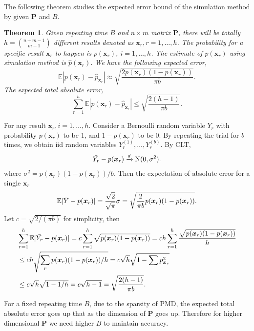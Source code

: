 \documentclass[12pt]{article}
\newcommand{\EE}{\mathbb{E}}
\newcommand{\Pmat}{\mathbf{P}}
\newcommand{\PMD}{\textrm{PMD}}
\newcommand{\wh}{\widehat}
\newcommand{\xvec}{\boldsymbol{x}}
\newtheorem{thm}{Theorem}
\begin{document}
The following theorem studies the expected error bound of the simulation method by given $\Pmat$ and $B$.
\begin{thm}
Given repeating time $B$ and $n \times m$ matrix $\Pmat$, there will be totally  $h=\binom{n+m-1}{m-1}$ different results denoted as $\xvec_r, r=1,\dots,h$. The probability for a specific result $\xvec_{r}$ to happen is $p(\xvec_{r})$, $i=1,\dots,h$. The estimate of  $p(\xvec_r)$ using simulation method is $\wh{p}(\xvec_r)$. We have the following expected error,
\begin{equation*}
\EE|p(\xvec_r) - \wh{p}_{\xvec_r}| \approx  \sqrt{\frac{2 p(\xvec_r)(1-p(\xvec_r))}{\pi b}}.
\end{equation*}
The expected total absolute error,
$$\sum_{r=1}^{h} \EE|p(\xvec_r) - \wh{p}_{\xvec_r}| \leq \sqrt{\frac{2(h-1)}{\pi b}}.$$
\end{thm}

For any result $\xvec_r,i=1,\dots,h$. Consider a Bernoulli random variable $Y_r$ with probability $p(\xvec_r)$ to be 1, and $1-p(\xvec_r)$ to be 0. By repeating the trial for $b$ times, we obtain iid random variables $Y_r^{(1)},\dots,Y_r^{(b)}$. By CLT,
\begin{equation*}
    \Bar{Y_r}-p(\xvec_r) \xrightarrow{d} \textrm{N}(0,\sigma^2).
\end{equation*}
where $\sigma^2 = p(\xvec_r)(1-p(\xvec_r))/b$. Then the expectation of absolute error for a single $\xvec_r$
\begin{equation*}
    \EE |\Bar{Y}-p(\xvec_r)| = \frac{\sqrt{2}}{\sqrt{\pi}}\sigma = \sqrt{\frac{2}{\pi b}p(\xvec_r)(1-p(\xvec_r))}.
\end{equation*}
Let $c = \sqrt{2/(\pi b)}$ for simplicity, then
\begin{align*}
    & \sum_{r=1}^{h}\EE |\Bar{Y_r}-p(\xvec_r)| = c \sum_{r=1}^{h} \sqrt{p(\xvec_r)(1-p(\xvec_r))}  = c h \sum_{r=1}^{h}\frac{\sqrt{p(\xvec_r)(1-p(\xvec_r))}}{h} \\
    & \leq c h \sqrt{\sum_{r}p(\xvec_r)(1-p(\xvec_r))/h} = c \sqrt{h} \sqrt{1-\sum p_{\xvec_{r}}^2}\\ &\leq c \sqrt{h} \sqrt{1-1/h} = c\sqrt{h-1} = \sqrt{\frac{2(h-1)}{\pi b}}.
\end{align*}

For a fixed repeating time $B$, due to the sparsity of $\PMD$, the expected total absolute error goes up that as the dimension of $\Pmat$ goes up. Therefore for higher dimensional $\Pmat$ we need higher $B$ to maintain accuracy.
\end{document}
